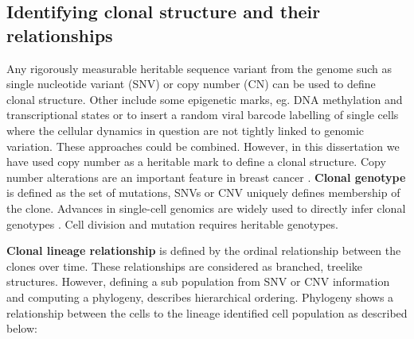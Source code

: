 \subsection{Identifying clonal structure and their relationships}

Any rigorously measurable heritable sequence variant from the genome such as single nucleotide variant (SNV) or copy number (CN) can be used to define clonal structure. 
Other include some epigenetic marks, eg. DNA methylation and transcriptional states or to insert a random viral barcode labelling of single cells where the cellular dynamics in question are not tightly linked to genomic variation. These approaches could be combined. However, in this dissertation we have used copy number as a heritable mark to define a clonal structure. Copy number alterations are an important feature in breast cancer \cite{zhang2009copy, pollack2002microarray}. \textbf{Clonal genotype} is defined as the set of mutations, SNVs or CNV uniquely defines membership of the clone. Advances in single-cell genomics are widely used to directly infer clonal genotypes \cite{macosko2015highly,laks2019clonal}. Cell division and mutation requires heritable genotypes.


 \textbf{Clonal lineage relationship} is defined by the ordinal relationship between the clones over time. These relationships are considered as branched, treelike structures. However, defining a sub population from SNV or CNV information and computing a phylogeny, describes hierarchical ordering. Phylogeny shows a relationship between the cells to the lineage identified cell population as described below:
 
